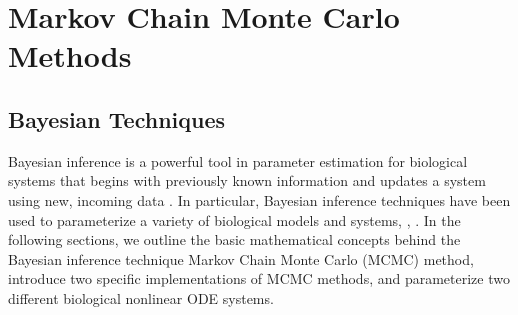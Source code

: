 \section{Markov Chain Monte Carlo Methods} \label{MCMC_SECT}
\subsection{Bayesian Techniques} \label{Bayesian_Techniques}
Bayesian inference is a powerful tool in parameter estimation for biological systems that begins with previously known information and updates a system using new, incoming data \cite{bayesian_param_inf}.  In particular, Bayesian inference techniques have been used to parameterize a variety of biological models and systems, \cite{bayesian_param_inf_ex1}, \cite{bayesian_param_inf_ex2}. In the following sections, we outline the basic mathematical concepts behind the Bayesian inference technique Markov Chain Monte Carlo (MCMC) method, introduce two specific implementations of MCMC methods, and parameterize two different biological nonlinear ODE systems.

